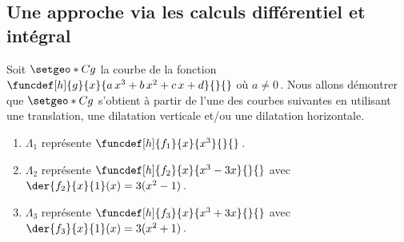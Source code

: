 \subsection{Une approche via les calculs différentiel et intégral}

\leavevmode
\smallskip




Soit $\setgeo*{C}{g}$ la courbe de la fonction
$\funcdef[h]{g}{x}{a \, x^3 + b \, x^2 + c \, x + d}{}{}$
où $a\neq 0$\,.
Nous allons démontrer que $\setgeo*{C}{g}$ s'obtient à partir de l'une des courbes suivantes en utilisant une translation, une dilatation verticale et/ou une dilatation horizontale.

\begin{enumerate}
	\item $\Lambda_1$ représente $\funcdef[h]{f_1}{x}{x^3}{}{}$\,.

	\item $\Lambda_2$ représente $\funcdef[h]{f_2}{x}{x^3 - 3 x}{}{}$ avec $\der{f_2}{x}{1}(x) = 3(x^2 - 1)$\,.

	\item $\Lambda_3$ représente $\funcdef[h]{f_3}{x}{x^3 + 3 x}{}{}$ avec $\der{f_3}{x}{1}(x) = 3(x^2 + 1)$\,.
\end{enumerate}


